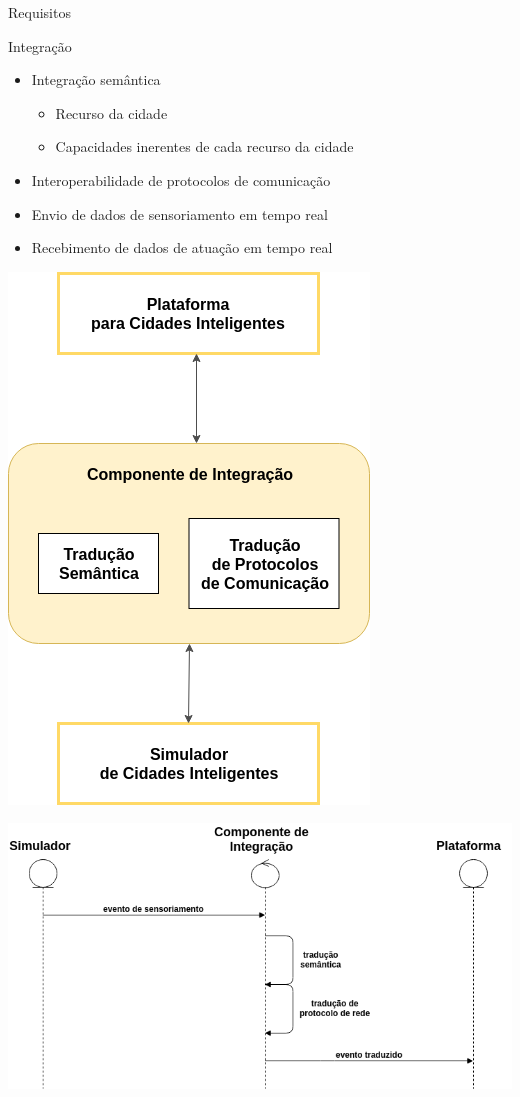 \documentclass[xcolor={usenames,svgnames,dvipsnames},brazil,english,12pt,aspectratio=149]{beamer}
\begin{document}
\begin{frame}{Requisitos}
    \begin{block}{Integração}
        \begin{itemize}
            \item Integração semântica
                \begin{itemize}
                    \item Recurso da cidade
                    \item Capacidades inerentes de cada recurso da cidade
                \end{itemize}
            \item Interoperabilidade de protocolos de comunicação
            \item Envio de dados de sensoriamento em tempo real
            \item Recebimento de dados de atuação em tempo real
        \end{itemize}
    \end{block}
\end{frame}

\begin{frame}[plain]
    \begin{center}
        \includegraphics[width=.4\textwidth]{integration-general-architecture.png}
    \end{center}
\end{frame}

\begin{frame}[plain]
    \begin{center}
        \includegraphics[width=.8\textwidth]{sequencia_eventos_sensores.png}
    \end{center}
\end{frame}
\end{document}
